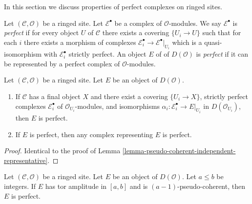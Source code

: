 \noindent
In this section we discuss properties of perfect complexes on
ringed sites.

\begin{definition}
\label{definition-perfect}
Let $(\mathcal{C}, \mathcal{O})$ be a ringed site.
Let $\mathcal{E}^\bullet$ be a complex of $\mathcal{O}$-modules.
We say $\mathcal{E}^\bullet$ is {\it perfect} if for every object $U$ of
$\mathcal{C}$ there exists a covering $\{U_i \to U\}$ such that for each $i$
there exists a morphism of complexes
$\mathcal{E}_i^\bullet \to \mathcal{E}^\bullet|_{U_i}$
which is a quasi-isomorphism with $\mathcal{E}_i^\bullet$
strictly perfect.
An object $E$ of of $D(\mathcal{O})$ is {\it perfect}
if it can be represented by a perfect complex of $\mathcal{O}$-modules.
\end{definition}

\begin{lemma}
\label{lemma-perfect-independent-representative}
Let $(\mathcal{C}, \mathcal{O})$ be a ringed site.
Let $E$ be an object of $D(\mathcal{O})$.
\begin{enumerate}
\item If $\mathcal{C}$ has a final object $X$ and there exist a
covering $\{U_i \to X\}$, strictly perfect complexes $\mathcal{E}_i^\bullet$
of $\mathcal{O}_{U_i}$-modules, and isomorphisms
 $\alpha_i : \mathcal{E}_i^\bullet \to E|_{U_i}$ in
$D(\mathcal{O}_{U_i})$, then $E$ is perfect.
\item If $E$ is perfect, then any complex representing $E$ is perfect.
\end{enumerate}
\end{lemma}

\begin{proof}
Identical to the proof of
Lemma \ref{lemma-pseudo-coherent-independent-representative}.
\end{proof}

\begin{lemma}
\label{lemma-perfect-precise}
Let $(\mathcal{C}, \mathcal{O})$ be a ringed site.
Let $E$ be an object of $D(\mathcal{O})$.
Let $a \leq b$ be integers. If $E$ has tor amplitude in $[a, b]$
and is $(a - 1)$-pseudo-coherent, then $E$ is perfect.
\end{lemma}

